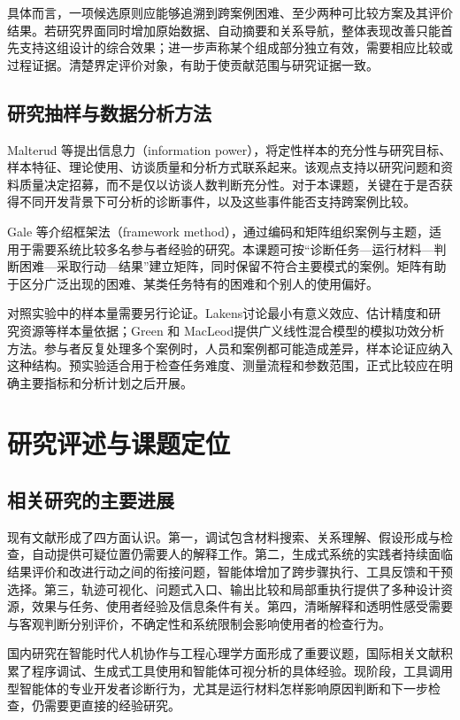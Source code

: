 具体而言，一项候选原则应能够追溯到跨案例困难、至少两种可比较方案及其评价结果。若研究界面同时增加原始数据、自动摘要和关系导航，整体表现改善只能首先支持这组设计的综合效果；进一步声称某个组成部分独立有效，需要相应比较或过程证据。清楚界定评价对象，有助于使贡献范围与研究证据一致。

\subsection{研究抽样与数据分析方法}

Malterud 等\cite{malterud2016information}提出信息力（information power），将定性样本的充分性与研究目标、样本特征、理论使用、访谈质量和分析方式联系起来。该观点支持以研究问题和资料质量决定招募，而不是仅以访谈人数判断充分性。对于本课题，关键在于是否获得不同开发背景下可分析的诊断事件，以及这些事件能否支持跨案例比较。

Gale 等\cite{gale2013framework}介绍框架法（framework method），通过编码和矩阵组织案例与主题，适用于需要系统比较多名参与者经验的研究。本课题可按“诊断任务—运行材料—判断困难—采取行动—结果”建立矩阵，同时保留不符合主要模式的案例。矩阵有助于区分广泛出现的困难、某类任务特有的困难和个别人的使用偏好。

对照实验中的样本量需要另行论证。Lakens\cite{ref67}讨论最小有意义效应、估计精度和研究资源等样本量依据；Green 和 MacLeod\cite{ref68}提供广义线性混合模型的模拟功效分析方法。参与者反复处理多个案例时，人员和案例都可能造成差异，样本论证应纳入这种结构。预实验适合用于检查任务难度、测量流程和参数范围，正式比较应在明确主要指标和分析计划之后开展。

\section{研究评述与课题定位}

\subsection{相关研究的主要进展}

现有文献形成了四方面认识。第一，调试包含材料搜索、关系理解、假设形成与检查，自动提供可疑位置仍需要人的解释工作。第二，生成式系统的实践者持续面临结果评价和改进行动之间的衔接问题，智能体增加了跨步骤执行、工具反馈和干预选择。第三，轨迹可视化、问题式入口、输出比较和局部重执行提供了多种设计资源，效果与任务、使用者经验及信息条件有关。第四，清晰解释和透明性感受需要与客观判断分别评价，不确定性和系统限制会影响使用者的检查行为。

国内研究在智能时代人机协作与工程心理学方面形成了重要议题，国际相关文献积累了程序调试、生成式工具使用和智能体可视分析的具体经验。现阶段，工具调用型智能体的专业开发者诊断行为，尤其是运行材料怎样影响原因判断和下一步检查，仍需要更直接的经验研究。

